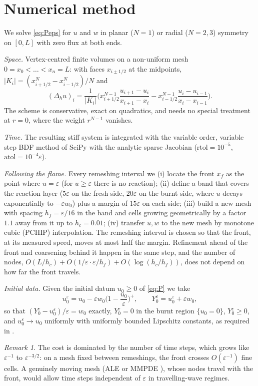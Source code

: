 \documentclass[11pt]{amsart}
\theoremstyle{remark}
\newtheorem{remark}[theorem]{Remark}
\newcommand{\ve}{\varepsilon}
\begin{document}
\section{Numerical method}\label{sec:method}

We solve \eqref{eq:Peps} for $u$ and $w$ in planar ($N=1$) or radial
($N=2,3$) symmetry on $[0,L]$ with zero flux at both ends.

\emph{Space.} Vertex-centred finite volumes on a non-uniform mesh
$0=x_0<\dots<x_n=L$: with faces $x_{i\pm1/2}$ at the midpoints,
$|K_i|=(x_{i+1/2}^N-x_{i-1/2}^N)/N$ and
\[
(\Delta_hu)_i=\frac1{|K_i|}\Big(x_{i+1/2}^{N-1}\frac{u_{i+1}-u_i}{x_{i+1}-x_i}
-x_{i-1/2}^{N-1}\frac{u_i-u_{i-1}}{x_i-x_{i-1}}\Big).
\]
The scheme is conservative, exact on quadratics, and needs no special
treatment at $r=0$, where the weight $r^{N-1}$ vanishes.

\emph{Time.} The resulting stiff system is integrated with the variable
order, variable step BDF method of SciPy with the analytic sparse Jacobian
($\mathrm{rtol}=10^{-5}$, $\mathrm{atol}=10^{-4}\ve$).

\emph{Following the flame.} Every remeshing interval we
(i) locate the front $x_f$ as the point where $u=\ve$ (for $u\ge\ve$ there is
no reaction); (ii) define a band that covers the reaction layer ($5\ve$ on the
fresh side, $20\ve$ on the burnt side, where $u$ decays exponentially to
$-\ve w_0$) plus a margin of $15\ve$ on each side; (iii) build a new mesh
with spacing $h_f=\ve/16$ in the band and cells growing geometrically by a
factor $1.1$ away from it up to $h_c=0.01$; (iv) transfer $u,w$ to the new mesh
by monotone cubic (PCHIP) interpolation. The remeshing interval is chosen so
that the front, at its measured speed, moves at most half the margin.
Refinement ahead of the front and coarsening behind it happen in the same
step, and the number of nodes,
$O(L/h_c)+O(1/\ve\cdot\ve/h_f)+O(\log(h_c/h_f))$, does not depend on how far the
front travels.

\emph{Initial data.} Given the initial datum $u_0\ge0$ of \eqref{eq:P} we take
\[
u_0^\ve=u_0-\ve w_0\Big(1-\frac{u_0}\ve\Big)^+,\qquad Y_0^\ve=u_0^\ve+\ve w_0,
\]
so that $(Y_0^\ve-u_0^\ve)/\ve=w_0$ exactly, $Y_0^\ve=0$ in the burnt region
$\{u_0=0\}$, $Y_0^\ve\ge0$, and $u_0^\ve\to u_0$ uniformly with uniformly bounded
Lipschitz constants, as required in \cite{FernandezBonderWolanski2004}.

\begin{remark}
The cost is dominated by the number of time steps, which grows like
$\ve^{-1}$ to $\ve^{-3/2}$: on a mesh fixed between remeshings, the front
crosses $O(\ve^{-1})$ fine cells. A genuinely moving mesh (ALE or MMPDE
\cite{HuangRussell2011}), whose nodes travel with the front, would allow time
steps independent of $\ve$ in travelling-wave regimes.
\end{remark}
\end{document}
